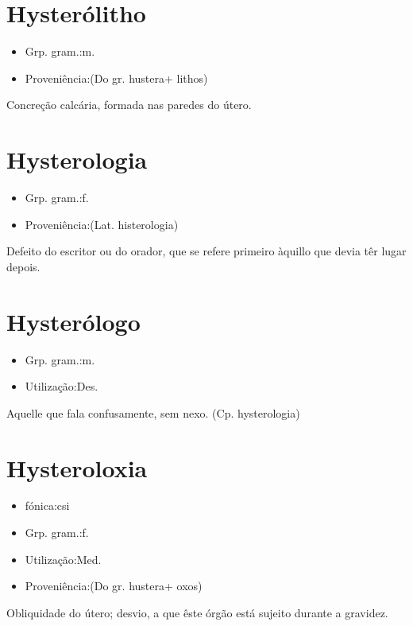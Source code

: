 \documentclass{article}
\begin{document}
\section{Hysterólitho}
\begin{itemize}
\item {Grp. gram.:m.}
\end{itemize}
\begin{itemize}
\item {Proveniência:(Do gr. \textunderscore hustera\textunderscore  + \textunderscore lithos\textunderscore )}
\end{itemize}
Concreção calcária, formada nas paredes do útero.
\section{Hysterologia}
\begin{itemize}
\item {Grp. gram.:f.}
\end{itemize}
\begin{itemize}
\item {Proveniência:(Lat. \textunderscore histerologia\textunderscore )}
\end{itemize}
Defeito do escritor ou do orador, que se refere primeiro àquillo que devia têr lugar depois.
\section{Hysterólogo}
\begin{itemize}
\item {Grp. gram.:m.}
\end{itemize}
\begin{itemize}
\item {Utilização:Des.}
\end{itemize}
Aquelle que fala confusamente, sem nexo.
(Cp. \textunderscore hysterologia\textunderscore )
\section{Hysteroloxia}
\begin{itemize}
\item {fónica:csi}
\end{itemize}
\begin{itemize}
\item {Grp. gram.:f.}
\end{itemize}
\begin{itemize}
\item {Utilização:Med.}
\end{itemize}
\begin{itemize}
\item {Proveniência:(Do gr. \textunderscore hustera\textunderscore  + \textunderscore oxos\textunderscore )}
\end{itemize}
Obliquidade do útero; desvio, a que êste órgão está sujeito durante a gravidez.
\end{document}
